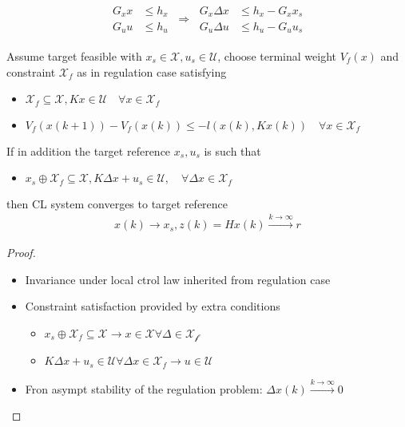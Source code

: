 

\begin{align*}
	\begin{aligned}
		G_x  x & \leq h_x \\
		G_u  u & \leq h_u
	\end{aligned}
	\ \Rightarrow \
	\begin{aligned}
		G_x \Delta x & \leq h_x - G_x x_s \\
		G_u \Delta u & \leq h_u - G_u u_s
	\end{aligned}
\end{align*}




Assume target feasible with $x_s \in \mathcal{X}, u_s \in \mathcal{U}$,
choose terminal weight $V_f(x)$ and constraint $\mathcal{X}_f$ as in regulation case satisfying
\begin{itemize}[leftmargin=1em]
	\item $\mathcal{X}_f \subseteq \mathcal{X}, K x \in \mathcal{U} \quad \forall x \in \mathcal{X}_f$
	\item $V_f(x(k+1)) - V_f(x(k)) \leq -l (x(k), Kx(k)) \quad \forall x \in \mathcal{X}_f$
\end{itemize}
If in addition the target reference $x_s, u_s$ is such that
\begin{itemize}[leftmargin=1em]
	\item $x_s \oplus \mathcal{X}_f \subseteq \mathcal{X}, K\Delta x + u_s \in \mathcal{U}, \quad \forall \Delta x \in \mathcal{X}_f$
\end{itemize}
then CL system converges to target reference
\begin{align*}
	x(k) \to x_s, z(k) = Hx(k) \xrightarrow{k\to\infty}r
\end{align*}

\begin{proof}

	\begin{itemize}[leftmargin = 1em]
		\item Invariance under local ctrol law inherited from regulation case
		\item Constraint satisfaction provided by extra conditions
		      \begin{itemize}
			      \item $x_s \oplus \mathcal{X}_f \subseteq \mathcal{X} \to x\in \mathcal{X} \forall \Delta \in\mathcal{X_f}$
			      \item $K\Delta x + u_s \in \mathcal{U} \forall \Delta x \in \mathcal{X}_f \to u\in\mathcal{U}$
		      \end{itemize}
		\item Fron asympt stability of the regulation problem: $\Delta x (k) \xrightarrow{k\to\infty}0$
	\end{itemize}
\end{proof}

